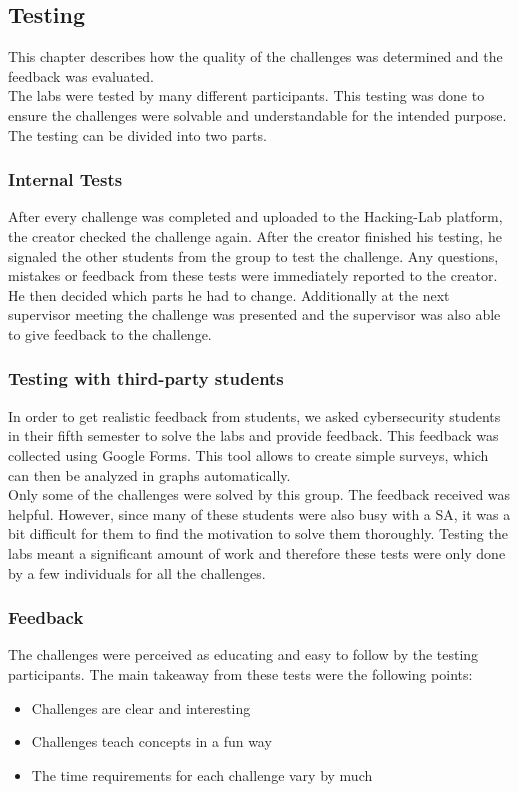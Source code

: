 \label{sec:testing}
\subsection{Testing}
This chapter describes how the quality of the challenges was determined and the feedback was evaluated. \\
The labs were tested by many different participants. This testing was done to ensure the challenges were solvable and understandable for the intended purpose. The testing can be divided into two parts.

\subsubsection{Internal Tests}
After every challenge was completed and uploaded to the Hacking-Lab platform, the creator checked the challenge again. After the creator finished his testing, he signaled the other students from the group to test the challenge. Any questions, mistakes or feedback from these tests were immediately reported to the creator. He then decided which parts he had to change. Additionally at the next supervisor meeting the challenge was presented and the supervisor was also able to give feedback to the challenge.

\subsubsection{Testing with third-party students}
In order to get realistic feedback from students, we asked cybersecurity students in their fifth semester to solve the labs and provide feedback. This feedback was collected using Google Forms. This tool allows to create simple surveys, which can then be analyzed in graphs automatically. \\
Only some of the challenges were solved by this group. The feedback received was helpful. However, since many of these students were also busy with a SA, it was a bit difficult for them to find the motivation to solve them thoroughly. Testing the labs meant a significant amount of work and therefore these tests were only done by a few individuals for all the challenges.

\subsubsection{Feedback}
The challenges were perceived as educating and easy to follow by the testing participants. The main takeaway from these tests were the following points:
\begin{itemize}
    \item Challenges are clear and interesting
    \item Challenges teach concepts in a fun way
    \item The time requirements for each challenge vary by much
  \end{itemize}

